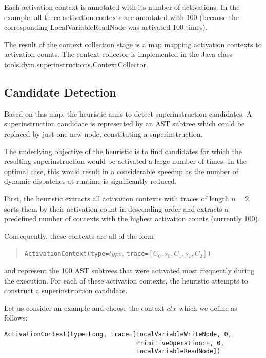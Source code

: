 \documentclass[10pt,a4paper]{article}
\begin{document}
Each activation context is annotated with its number of activations. In the example, all three activation contexts are annotated with $100$ (because the corresponding \textsf{LocalVariableReadNode} was activated 100 times). 

The result of the context collection stage is a map mapping activation contexts to activation counts. The context collector is implemented in the Java class \textsf{tools.dym.superinstructions.ContextCollector}.

\subsection{Candidate Detection}

Based on this map, the heuristic aims to detect superinstruction candidates. A superinstruction candidate is represented by an AST subtree which could be replaced by just one new node, constituting a superinstruction.

The underlying objective of the heuristic is to find candidates for which the resulting superinstruction would be activated a large number of times. In the optimal case, this would result in a considerable speedup as the number of dynamic dispatches at runtime is significantly reduced.

First, the heuristic extracts all activation contexts with traces of length $n = 2$, sorts them by their activation count in descending order and extracts a predefined number of contexts with the highest activation counts (currently 100).

Consequently, these contexts are all of the form

\begin{quotation}
\verb|ActivationContext(type=|$type$, \verb|trace=|$[C_0, s_0, C_1, s_1, C_2]$\verb|)|
\end{quotation}
and represent the 100 AST subtrees that were activated most frequently during the execution. For each of these activation contexts, the heuristic attempts to construct a superinstruction candidate.

Let us consider an example and choose the context $ctx$ which we define as follows:

\begin{verbatim}
ActivationContext(type=Long, trace=[LocalVariableWriteNode, 0,
                                    PrimitiveOperation:+, 0,
                                    LocalVariableReadNode])
\end{verbatim}
\end{document}
